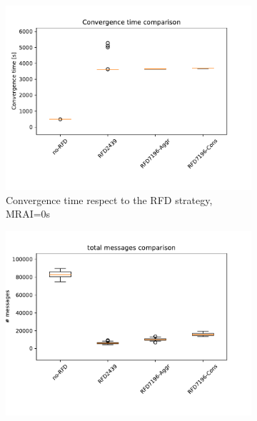 \begin{figure}[H]
     \centering
     \begin{subfigure}[b]{0.325\textwidth}
         \centering
         \includegraphics[width=\textwidth]{images/RFD/miceVSelephants/MultiMRAI/0/elephants/cisco_1000MRAI0_rfd_comparison_time_boxplot.pdf}
         \caption{Convergence time respect to the RFD strategy, MRAI=0s}
         \label{fig:1000_RFD_MRAI30_time_elephant}
     \end{subfigure}
     \hfill
     \begin{subfigure}[b]{0.325\textwidth}
         \centering
         \includegraphics[width=\textwidth]{images/RFD/miceVSelephants/MultiMRAI/0/elephants/cisco_1000MRAI0_rfd_comparison_messages_boxplot.pdf}

\end{subfigure}
\end{figure}
